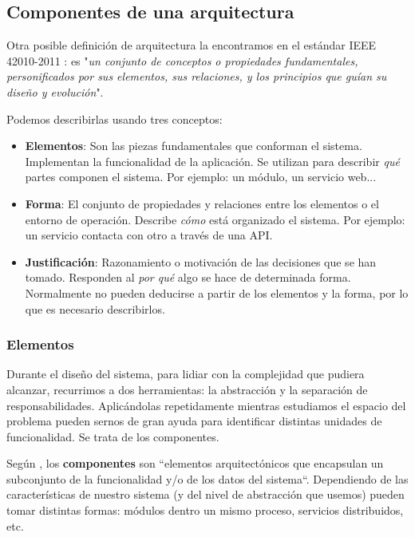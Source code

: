 \subsection{Componentes de una arquitectura}

Otra posible definición de arquitectura la encontramos en el estándar IEEE 42010-2011 \cite{ieeeStandard420102011Systems2011}: es "\textit{un conjunto de conceptos o propiedades fundamentales, personificados por sus elementos, sus relaciones, y los principios que guían su diseño y evolución}".

Podemos describirlas usando tres conceptos: \cite{perryFoundationsStudySoftware1992}

    \begin{itemize}
        \item \textbf{Elementos}: Son las piezas fundamentales que conforman el sistema. Implementan la funcionalidad de la aplicación. Se utilizan para describir \textit{qué} partes componen el sistema. Por ejemplo: un módulo, un servicio web...

        \item \textbf{Forma}: El conjunto de propiedades y relaciones entre los elementos o el entorno de operación. Describe \textit{cómo} está organizado el sistema. Por ejemplo: un servicio contacta con otro a través de una API.

        \item \textbf{Justificación}: Razonamiento o motivación de las decisiones que se han tomado. Responden al \textit{por qué} algo se hace de determinada forma. Normalmente no pueden deducirse a partir de los elementos y la forma, por lo que es necesario describirlos.

    \end{itemize}

\pagebreak

\subsubsection{Elementos}

Durante el diseño del sistema, para lidiar con la complejidad que pudiera alcanzar, recurrimos a dos herramientas: la abstracción y la separación de responsabilidades. \cite{martinCleanArchitectureCraftsman2018} Aplicándolas repetidamente mientras estudiamos el espacio del problema pueden sernos de gran ayuda para identificar distintas unidades de funcionalidad. Se trata de los componentes.

Según \cite{taylorSoftwareArchitectureFoundations2009}, los \textbf{componentes} son ``elementos arquitectónicos que encapsulan un subconjunto de la funcionalidad y/o de los datos del sistema``.
Dependiendo de las características de nuestro sistema (y del nivel de abstracción que usemos) pueden tomar distintas formas: módulos dentro un mismo proceso, servicios distribuidos, etc.

